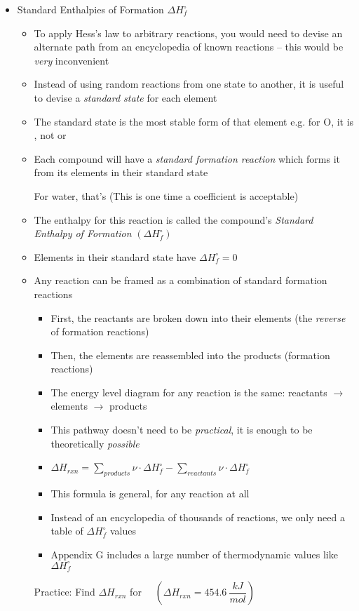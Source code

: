 \documentclass[12pt, openany, letterpaper]{memoir}
\begin{document}
\begin{itemize}
  \item Standard Enthalpies of Formation $\Delta H_{f}^\circ$
    \begin{itemize}
      \item To apply Hess's law to arbitrary reactions, you would need to devise an alternate path from an encyclopedia of known reactions -- this would be \emph{very} inconvenient
      \item Instead of using random reactions from one state to another, it is useful to devise a \emph{standard state} for each element
      \item The standard state is the most stable form of that element e.g. for O, it is , not  or 
      \item Each compound will have a \emph{standard formation reaction} which forms it from its elements in their standard state

            For water, that's  \hspace{1em} (This is one time a  coefficient is acceptable)
      \item The enthalpy for this reaction is called the compound's \emph{Standard Enthalpy of Formation} $\left(\Delta H^\circ_f\right)$
      \item Elements in their standard state have $\Delta H^\circ_f = 0$
      \item Any reaction can be framed as a combination of standard formation reactions
        \begin{itemize}
          \item First, the reactants are broken down into their elements (the \emph{reverse} of formation reactions)
          \item Then, the elements are reassembled into the products (formation reactions)
          \item The energy level diagram for any reaction is the same: reactants $\rightarrow$ elements $\rightarrow$ products
          \item This pathway doesn't need to be \emph{practical}, it is enough to be theoretically \emph{possible}
          \item $\Delta H_{rxn}=\sum\limits_{products}\nu\cdot\Delta H^\circ_f - \sum\limits_{reactants}\nu\cdot\Delta H^\circ_f$
          \item This formula is general, for any reaction at all
          \item Instead of an encyclopedia of thousands of reactions, we only need a table of $\Delta H^\circ_f$ values
          \item Appendix G includes a large number of thermodynamic values like $\Delta H^\circ_f$
        \end{itemize}
        Practice: Find $\Delta H_{rxn}$ for~~  \hspace{1em} $\left(\Delta H_{rxn}=454.6~\dfrac{kJ}{mol}\right)$


\end{itemize}
\end{itemize}
\end{document}
